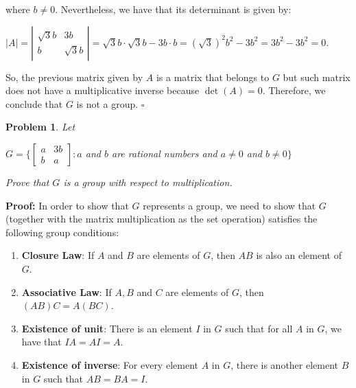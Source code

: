 \documentclass[a4paper,openany,11pt]{book}
\newtheorem{Prob}{Problem}
\begin{document}
where $b \neq 0$. Nevertheless, we have that its determinant is given by:

\begin{center}
	$\left|A\right| = \left|\begin{array}{cc}
		\sqrt{3}b & 3b\\
		b & \sqrt{3}b
	\end{array}\right| = \sqrt{3}b\cdot\sqrt{3}b - 3b\cdot b = (\sqrt{3})^{2}b^{2} - 3b^{2} = 3b^{2} - 3b^{2} = 0$.
\end{center}

So, the previous matrix given by $A$ is a matrix that belongs to $G$ but such matrix does not have a multiplicative inverse because $\det(A) = 0$. Therefore, we conclude that $G$ is not a group. \hspace{0.1cm} $\square$

\begin{Prob}
	Let
	
	\begin{center}
		$G = \biggl\{\left[\begin{array}{cc}
		a & 3b\\
		b & a
		\end{array}\right] : a$ and $b$ are rational numbers and $a \neq 0$ and $b \neq 0\biggr\} $
	\end{center}
	
	Prove that $G$ is a group with respect to multiplication.
\end{Prob}

\textbf{Proof:} In order to show that $G$ represents a group, we need to show that $G$ (together with the matrix multiplication as the set operation) satisfies the following group conditions:

\begin{enumerate}
	\item \textbf{Closure Law}: If $A$ and $B$ are elements of $G$, then $AB$ is also an element of $G$. 
	
	\item \textbf{Associative Law}: If $A, B$ and $C$ are elements of $G$, then $(AB)C = A(BC)$.
	
	\item \textbf{Existence of unit}: There is an element $I$ in $G$ such that for all $A$ in $G$, we have that $IA = AI = A$.
	
	\item \textbf{Existence of inverse}: For every element $A$ in $G$, there is another element $B$ in $G$ such that $AB = BA = I$.
\end{enumerate}
\end{document}
